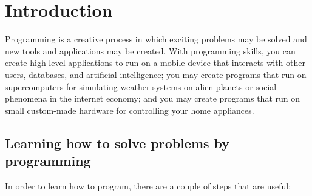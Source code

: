 \chapter{Introduction}
\label{chap:introduction}
Programming is a creative process in which exciting problems may be solved and new tools and applications may be created. With programming skills, you can create high-level applications to run on a mobile device that interacts with other users, databases, and artificial intelligence; you may create programs that run on supercomputers for simulating weather systems on alien planets or social phenomena in the internet economy; and you may create programs that run on small custom-made hardware for controlling your home appliances. 

\section{Learning how to solve problems by programming}
In order to learn how to program, there are a couple of steps that are useful:
